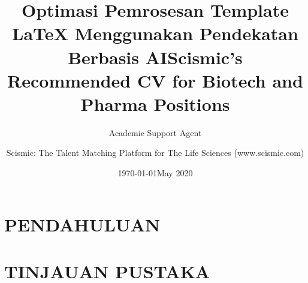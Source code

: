 \documentclass{article}
\title{Optimasi Pemrosesan Template LaTeX Menggunakan Pendekatan Berbasis AI}
\author{Academic Support Agent}
\date{\today}
\begin{document}
\maketitle

\begin{abstract}

\end{abstract}

\chapter{PENDAHULUAN}


\chapter{TINJAUAN PUSTAKA}


\usepackage{scimisc-cv}

\title{Scismic's Recommended CV for Biotech and Pharma Positions}
\author{Scismic: The Talent Matching Platform for The Life Sciences (www.scismic.com)}
\date{May 2020}

\end{document}
